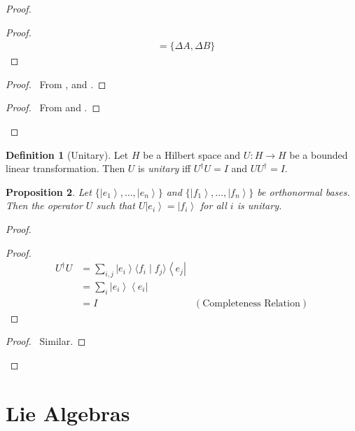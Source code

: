 \documentclass{book}
\let\qed\relax
\newtheorem{prop}{Proposition}[chapter]
\theoremstyle{definition}
\newtheorem{df}[prop]{Definition}
\newcommand{\bra}[1]{\ensuremath{\left\langle {#1} \right|}}
\newcommand{\ket}[1]{\ensuremath{\left| {#1} \right\rangle}}
\begin{document}
\begin{proof}
\begin{proof}
\begin{align*}
		& = \{ \Delta A, \Delta B \}
	\end{align*}
\end{proof}
\begin{proof}
	\pf\ From ,  and .
\end{proof}
\begin{proof}
	\pf\ From  and .
\end{proof}
\qed
\end{proof}

\begin{df}[Unitary]
Let $H$ be a Hilbert space and $U : H \rightarrow H$ be a bounded linear transformation. Then $U$ is \emph{unitary} iff $U^\dagger U = I$ and $U U^\dagger = I$.
\end{df}

\begin{prop}
Let $\{ \ket{e_1}, \ldots, \ket{e_n} \}$ and $\{ \ket{f_1}, \ldots, \ket{f_n} \}$ be orthonormal bases. Then the operator $U$ such that $U \ket{e_i} = \ket{f_i}$ for all $i$ is unitary.
\end{prop}

\begin{proof}
\pf
\step{1}{$U = \sum_i \ket{f_i} \bra{e_i}$}
\begin{proof}
	\pf
	\begin{align*}
		U^\dagger U & = \sum_{i,j} \ket{e_i} \langle f_i \mid f_j \rangle \bra{e_j} \\
		& = \sum_i \ket{e_i} \bra{e_i} \\
		& = I & (\text{Completeness Relation})
	\end{align*}
\end{proof}
\begin{proof}
	\pf\ Similar.
\end{proof}
\qed
\end{proof}

\chapter{Lie Algebras}
\end{document}
